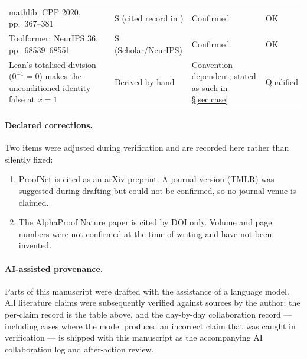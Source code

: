 \documentclass[11pt,a4paper]{article}
\theoremstyle{plain}
\theoremstyle{remark}
\begin{document}
\begin{table}[htbp]
\begin{tabular}{@{}p{5.2cm}p{1.6cm}p{1.7cm}p{2.4cm}p{1.6cm}@{}}
mathlib: CPP 2020, pp.\ 367--381 & \cite{mathlib2020} & S (cited record in \cite{moura2021lean4}) & Confirmed & OK \\
Toolformer: NeurIPS 36, pp.\ 68539--68551 & \cite{schick2023toolformer} & S (Scholar/NeurIPS) & Confirmed & OK \\
Lean's totalised division ($0^{-1}=0$) makes the unconditioned identity false at $x=1$
  & \cite{moura2021lean4,mathlib2020} & Derived by hand & Convention-dependent; stated as such in \S\ref{sec:case} & Qualified \\
\bottomrule
\end{tabular}
\end{table}

\paragraph{Declared corrections.}  Two items were adjusted during verification
and are recorded here rather than silently fixed:
\begin{enumerate}[label=(\arabic*),leftmargin=2.2em]
  \item ProofNet is cited as an arXiv preprint.  A journal version (TMLR) was
        suggested during drafting but could not be confirmed, so no journal
        venue is claimed.
  \item The AlphaProof Nature paper is cited by DOI only.  Volume and page
        numbers were not confirmed at the time of writing and have not been
        invented.
\end{enumerate}

\paragraph{AI-assisted provenance.}  Parts of this manuscript were drafted with
the assistance of a language model.  All literature claims were subsequently
verified against sources by the author; the per-claim record is the table
above, and the day-by-day collaboration record --- including cases where the
model produced an incorrect claim that was caught in verification --- is shipped
with this manuscript as the accompanying AI collaboration log and after-action
review.



\end{document}
